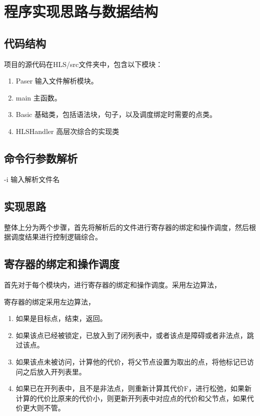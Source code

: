 \documentclass[12pt,hyperref,a4paper,UTF8]{ctexart}
\begin{document}
\section{程序实现思路与数据结构}

\subsection{代码结构}

项目的源代码在HLS/src文件夹中，包含以下模块：

\begin{enumerate}
    \item Paser 输入文件解析模块。
    \item main 主函数。
    \item Basic 基础类，包括语法块，句子，以及调度绑定时需要的点类。
    \item HLSHandler 高层次综合的实现类
\end{enumerate}

\subsection{命令行参数解析}

-i 输入解析文件名

\subsection{实现思路}

整体上分为两个步骤，首先将解析后的文件进行寄存器的绑定和操作调度，然后根据调度结果进行控制逻辑综合。

\subsection{寄存器的绑定和操作调度}

首先对于每个模块内，进行寄存器的绑定和操作调度。采用左边算法，

寄存器的绑定采用左边算法，

\begin{enumerate}
\item 如果是目标点，结束，返回。
\item 如果该点已经被锁定，已放入到了闭列表中，或者该点是障碍或者非法点，跳过该点。
\item 如果该点未被访问，计算他的代价，将父节点设置为取出的点，将他标记已访问之后放入开列表里。
\item 如果已在开列表中，且不是非法点，则重新计算其代价F，进行松弛，如果新计算的代价比原来的代价小，则更新开列表中对应点的代价和父节点，如果代价更大则不管。
\end{enumerate}
\end{document}
